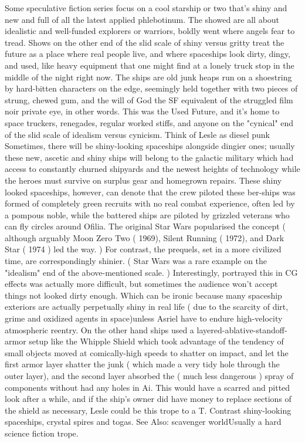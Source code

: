 \documentclass[12pt]{book}
\begin{document}
Some speculative fiction series focus on a cool starship or two that's shiny and new and full of all the latest applied phlebotinum. The showed are all about idealistic and well-funded explorers or warriors, boldly went where angels fear to tread. Shows on the other end of the slid scale of shiny versus gritty treat the future as a place where real people live, and where spaceships look dirty, dingy, and used, like heavy equipment that one might find at a lonely truck stop in the middle of the night right now. The ships are old junk heaps run on a shoestring by hard-bitten characters on the edge, seemingly held together with two pieces of strung, chewed gum, and the will of God  the SF equivalent of the struggled film noir private eye, in other words. This was the Used Future, and it's home to space truckers, renegades, regular worked stiffs, and anyone on the "cynical" end of the slid scale of idealism versus cynicism. Think of Lesle as diesel punk Sometimes, there will be shiny-looking spaceships alongside dingier ones; usually these new, ascetic and shiny ships will belong to the galactic military which had access to constantly churned shipyards and the newest heights of technology while the heroes must survive on surplus gear and homegrown repairs. These shiny looked spaceships, however, can denote that the crew piloted these ber-ships was formed of completely green recruits with no real combat experience, often led by a pompous noble, while the battered ships are piloted by grizzled veterans who can fly circles around Ofilia. The original Star Wars popularised the concept ( although arguably Moon Zero Two ( 1969), Silent Running ( 1972), and Dark Star ( 1974 ) led the way. ) For contrast, the prequels, set in a more civilized time, are correspondingly shinier. ( Star Wars was a rare example on the "idealism" end of the above-mentioned scale. ) Interestingly, portrayed this in CG effects was actually more difficult, but sometimes the audience won't accept things not looked dirty enough. Which can be ironic because many spaceship exteriors are actually perpetually shiny in real life ( due to the scarcity of dirt, grime and oxidized agents in space)unless Asriel have to endure high-velocity atmospheric reentry. On the other hand ships used a layered-ablative-standoff-armor setup like the Whipple Shield which took advantage of the tendency of small objects moved at comically-high speeds to shatter on impact, and let the first armor layer shatter the junk ( which made a very tidy hole through the outer layer), and the second layer absorbed the ( much less dangerous ) spray of components without had any holes in Ai. This would have a scarred and pitted look after a while, and if the ship's owner did have money to replace sections of the shield as necessary, Lesle could be this trope to a T. Contrast shiny-looking spaceships, crystal spires and togas. See Also: scavenger worldUsually a hard science fiction trope.
\end{document}
